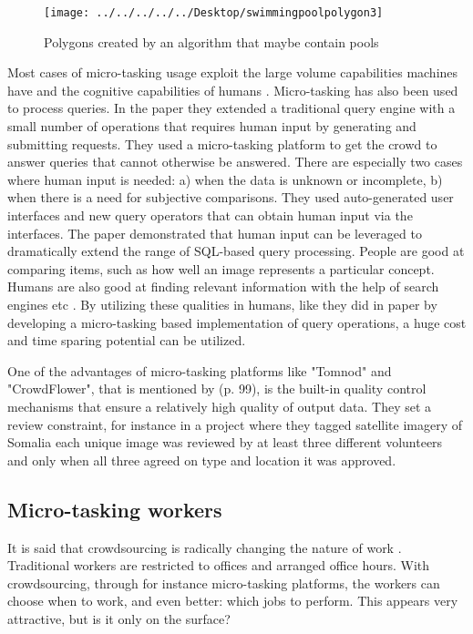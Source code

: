 \begin{figure}[H]
	\centering
	\texttt{[image: ../../../../../Desktop/swimmingpoolpolygon3]}
	\caption[Swimming pools  \citep{Nikki2016}]{Polygons created by an algorithm that maybe contain pools \citep{Nikki2016}}
	\label{fig:swimmingpoolpolygon3}
\end{figure}

Most cases of micro-tasking usage exploit the large volume capabilities machines have and the cognitive capabilities of humans \citep{Difallah2016}. Micro-tasking has also been used to process queries. In the \cite{Franklin2011} paper they extended a traditional query engine with a small number of operations that requires human input by generating and submitting requests.  They used a micro-tasking platform to get the crowd to answer queries that cannot otherwise be answered. There are especially two cases where human input is needed: a) when the data is unknown or incomplete, b) when there is a need for subjective comparisons. They used auto-generated user interfaces and new query operators that can obtain human input via the interfaces. The \cite{Franklin2011} paper demonstrated that human input can be leveraged to dramatically extend the range of SQL-based query processing. People are good at comparing items, such as how well an image represents a particular concept. Humans are also good at finding relevant information with the help of search engines etc \citep{Franklin2011}. By utilizing these qualities in humans, like they did in \citep{Franklin2011} paper by developing a micro-tasking based implementation of query operations, a huge cost and time sparing potential can be utilized. 

One of the advantages of micro-tasking platforms like "Tomnod" and "CrowdFlower", that is mentioned by \cite{Meier2013} (p. 99), is the built-in quality control mechanisms that ensure a relatively high quality of output data. They set a review constraint, for instance in a project where they tagged satellite imagery of Somalia each unique image was reviewed by at least three different volunteers and only when all three agreed on type and location it was approved. 

\subsection{Micro-tasking workers}
It is said that crowdsourcing is radically changing the nature of work \citep{Deng2016a}. Traditional workers are restricted to offices and arranged office hours. With crowdsourcing, through for instance micro-tasking platforms, the workers can choose when to work, and even better: which jobs to perform. This appears very attractive, but is it only on the surface? 

